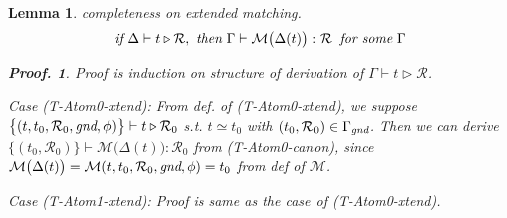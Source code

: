 \documentclass[12pt]{article}
\newtheorem{Lemma}{Lemma}[section]
\newtheorem{Proof}{Proof.}
\begin{document}
\begin{Lemma}{completeness on extended matching.}
  \label{completeness_on_extended_matching}
  \[ \text{\it if}\ \Delta \vdash t \triangleright \mathcal{R},\
      \text{\it then}\ \Gamma \vdash \mathcal{M}\bigl( \Delta(t) \bigr):
       \mathcal{R}\;\; \text{\it for some}\ \Gamma
  \]
  \begin{Proof}
    Proof is induction on structure of derivation of
    $\Gamma \vdash t \triangleright \mathcal{R}$.
    
    Case (T-Atom0-xtend): From def. of (T-Atom0-xtend), we suppose
    $\bigl\{(t, t_0, \mathcal{R}_0, \text{\it gnd}, \phi) \bigr\} \vdash
    t \triangleright \mathcal{R}_0$ s.t. $t \simeq t_0$ with
    $(t_0, \mathcal{R}_0) \in \Gamma_\text{\it gnd}$. Then
    we can derive $\bigl\{(t_0, \mathcal{R}_0) \bigr\} \vdash
    \mathcal{M}\bigl(\Delta(t) \bigr): \mathcal{R}_0$
    from (T-Atom0-canon), since
    $\mathcal{M}\bigl(\Delta(t) \bigr) = \mathcal{M}(t, t_0, \mathcal{R}_0,
    \text{\it gnd}, \phi) = t_0$ from def of $\mathcal{M}$.
    
    Case (T-Atom1-xtend): Proof is same as the case of (T-Atom0-xtend).
    

\end{Proof}
\end{Lemma}
\end{document}
